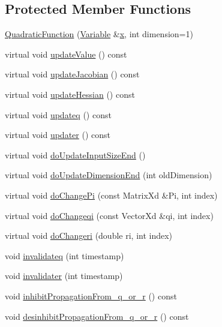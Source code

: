 \subsection*{Protected Member Functions}
\begin{DoxyCompactItemize}
\item 
\hyperlink{classocra_1_1QuadraticFunction_ac5792908a2b7cfdaf612c1e809100a5e}{Quadratic\+Function} (\hyperlink{classocra_1_1Variable}{Variable} \&\hyperlink{classocra_1_1Function_a28825886d1f149c87b112ec2ec1dd486}{x}, int dimension=1)
\item 
virtual void \hyperlink{classocra_1_1QuadraticFunction_aad5171c1f1b510fb861121da01a0ea75}{update\+Value} () const
\item 
virtual void \hyperlink{classocra_1_1QuadraticFunction_ad8fb5839a78b8ffb201e8ec5bb42cd70}{update\+Jacobian} () const
\item 
virtual void \hyperlink{classocra_1_1QuadraticFunction_a342ea525685ddc2c414a49e7480a7a4c}{update\+Hessian} () const
\item 
virtual void \hyperlink{classocra_1_1QuadraticFunction_ae68e94211c94e8c32da2220132baf248}{updateq} () const
\item 
virtual void \hyperlink{classocra_1_1QuadraticFunction_aeaa560b1771f4024755753236fd69779}{updater} () const
\item 
virtual void \hyperlink{classocra_1_1QuadraticFunction_ab3d5478fd8ded343453e0489c595e580}{do\+Update\+Input\+Size\+End} ()
\item 
virtual void \hyperlink{classocra_1_1QuadraticFunction_ad9b92a56e1c91c33630a5ba3f118c7b9}{do\+Update\+Dimension\+End} (int old\+Dimension)
\item 
virtual void \hyperlink{classocra_1_1QuadraticFunction_a30d2c2217918164d24aaeadde5698d03}{do\+Change\+Pi} (const Matrix\+Xd \&Pi, int index)
\item 
virtual void \hyperlink{classocra_1_1QuadraticFunction_abced87346b20e5ed323b966626487f16}{do\+Changeqi} (const Vector\+Xd \&qi, int index)
\item 
virtual void \hyperlink{classocra_1_1QuadraticFunction_aeaeed88d4fef66c5db465f2887320e37}{do\+Changeri} (double ri, int index)
\item 
void \hyperlink{classocra_1_1QuadraticFunction_ab98c6562b88ef393f03ea0d1c9863f0e}{invalidateq} (int timestamp)
\item 
void \hyperlink{classocra_1_1QuadraticFunction_a3d76d4ae8dc9ffbefcdf7027e72665c4}{invalidater} (int timestamp)
\end{DoxyCompactItemize}
{\bf }\par
\begin{DoxyCompactItemize}
\item 
void \hyperlink{classocra_1_1QuadraticFunction_ab42b63fecbd39d330f7ec7b13e5c3701}{inhibit\+Propagation\+From\+\_\+q\+\_\+or\+\_\+r} () const
\item 
void \hyperlink{classocra_1_1QuadraticFunction_a49b61db0ab95c82d8f42d66f4a4f60a9}{desinhibit\+Propagation\+From\+\_\+q\+\_\+or\+\_\+r} () const
\end{DoxyCompactItemize}

